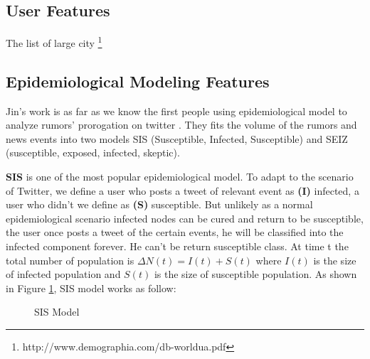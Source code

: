 \subsection{User Features}
The list of large city \footnote{http://www.demographia.com/db-worldua.pdf}
\subsection{Epidemiological Modeling Features}
Jin's work is as far as we know the first people using epidemiological model to analyze rumors' prorogation on twitter \cite{jin2013epidemiological}. They fits the volume of the rumors and news events into two models SIS (Susceptible, Infected, Susceptible) and SEIZ (susceptible, exposed, infected, skeptic). 

\textbf{SIS} is one of the most popular epidemiological model. To adapt to the scenario of Twitter, we define a user who posts a tweet of relevant event as \textbf{(I)} infected, a user who didn't we define as \textbf{(S)} susceptible. But unlikely as a normal epidemiological scenario infected nodes can be cured and return to be susceptible,  the user once posts a tweet of the certain events, he will be classified into the infected component forever. He can't be return susceptible class. At time t the total number of population is $\Delta N(t)= I(t) + S(t)$ where $I(t)$ is the size of infected population and  $S(t)$ is the size of susceptible population.  As shown in Figure \ref{fig:SIS}, SIS model works as follow:

\begin{figure}[!h]
\center
\def\layersep{2.5cm}
   \caption{SIS Model}
\label{fig:SIS}
\end{figure}
	
